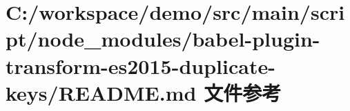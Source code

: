 \hypertarget{node__modules_2babel-plugin-transform-es2015-duplicate-keys_2_r_e_a_d_m_e_8md}{}\section{C\+:/workspace/demo/src/main/script/node\+\_\+modules/babel-\/plugin-\/transform-\/es2015-\/duplicate-\/keys/\+R\+E\+A\+D\+ME.md 文件参考}
\label{node__modules_2babel-plugin-transform-es2015-duplicate-keys_2_r_e_a_d_m_e_8md}
